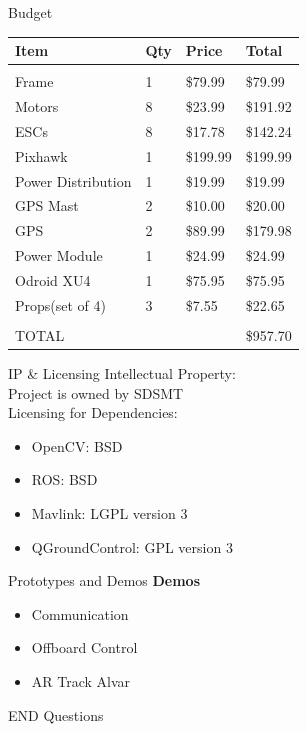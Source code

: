 \documentclass[11pt]{beamer}
\begin{document}
\begin{frame}{Budget}
\begin{table}[]
\centering
\begin{tabular}{|l|l|l|l|}
\hline
Item               & Qty & Price    & Total    \\ \hline
                   &     &          &          \\ \hline
Frame              & 1   & \$79.99  & \$79.99  \\ \hline
Motors             & 8   & \$23.99  & \$191.92 \\ \hline
ESCs               & 8   & \$17.78  & \$142.24 \\ \hline
Pixhawk            & 1   & \$199.99 & \$199.99 \\ \hline
Power Distribution & 1   & \$19.99  & \$19.99  \\ \hline
GPS Mast           & 2   & \$10.00  & \$20.00  \\ \hline
GPS                & 2   & \$89.99  & \$179.98 \\ \hline
Power Module       & 1   & \$24.99  & \$24.99  \\ \hline
Odroid XU4         & 1   & \$75.95  & \$75.95  \\ \hline
Props(set of 4)    & 3   & \$7.55   & \$22.65  \\ \hline
                   &     &          &          \\ \hline
TOTAL              &     &          & \$957.70 \\ \hline
\end{tabular}
\end{table}


\end{frame}


\begin{frame}{IP \& Licensing}
Intellectual Property:\\
Project is owned by SDSMT\\
\vspace{4mm}
Licensing for Dependencies:
\begin{itemize}
\item OpenCV: BSD 
\item ROS: BSD
\item Mavlink: LGPL version 3
\item QGroundControl: GPL version 3
\end{itemize}


\end{frame}



\begin{frame}{Prototypes and Demos}
\large{\textbf{Demos}}
\begin{itemize}
	\item Communication
	\item Offboard Control
	\item AR Track Alvar
\end{itemize}

\end{frame}






\begin{frame}{ END}
\centering	Questions
\end{frame}
\end{document}
